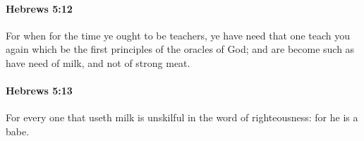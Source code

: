 		\paragraph{Hebrews 5:12} %
			\label{HEBREWS-5-12}

			For when for the time ye ought to be teachers, ye have need that one teach you again which be the first principles of the oracles of God; and are become such as have need of milk, and not of strong meat.

			\begin{framed}
			\scriptsize
				\begin{compactdesc}
					\item[SBLG] 
				\end{compactdesc}
			\end{framed}

		\paragraph{Hebrews 5:13} %
			\label{HEBREWS-5-13}

			For every one that useth milk is unskilful in the word of righteousness: for he is a babe.

